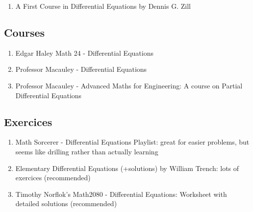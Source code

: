 \documentclass{article}
\begin{document}
\begin{enumerate}
    \item A First Course in Differential Equations by Dennis G. Zill
\end{enumerate}

\subsection{Courses}%
\label{sub:Courses}

\begin{enumerate}
    \item Edgar Haley Math 24 - Differential Equations
    \item Professor Macauley - Differential Equations
    \item Professor Macauley - Advanced Maths for Engineering: A course
	on Partial Differential Equations
\end{enumerate}

\subsection{Exercices}%
\label{sub:Exercices}

\begin{enumerate}
    \item Math Sorcerer - Differential Equations Playlist: great for easier
	problems, but seems like drilling rather than actually learning
    \item Elementary Differential Equations (+solutions) by William Trench:
	lots of exercices (recommended)
    \item Timothy Norflok's Math2080 - Differential Equations: Worksheet
	with detailed solutions (recommended)
\end{enumerate}

\pagebreak
\end{document}
